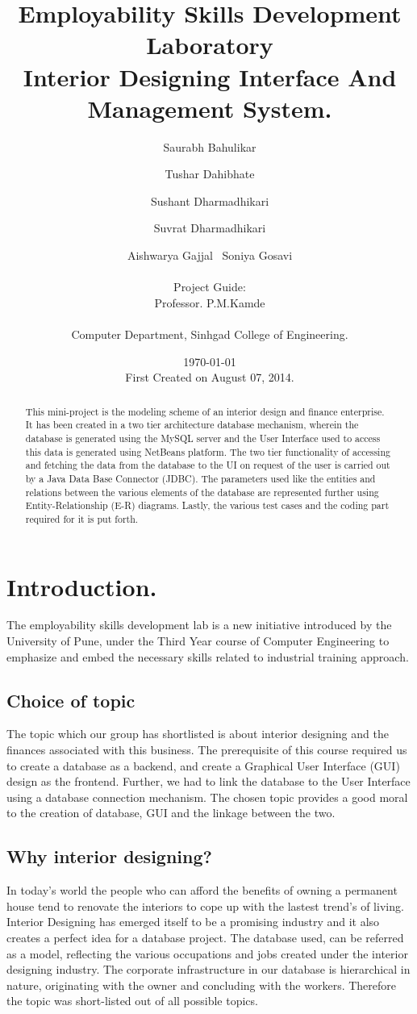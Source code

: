 \documentclass[12pt,a4paper]{report}
\title{Employability Skills Development Laboratory \\ \Large Interior Designing Interface And Management System.}
\author{ Saurabh Bahulikar\and Tushar Dahibhate \and Sushant Dharmadhikari \and Suvrat Dharmadhikari \and Aishwarya Gajjal \ Soniya Gosavi\\\\  Project Guide: \\ Professor. P.M.Kamde \\\\ Computer Department, Sinhgad College of Engineering.}
\date{\today \\ First Created on August 07, 2014.}
\begin{document}
\maketitle
\begin{abstract}
This mini-project is the modeling scheme of an interior design and finance enterprise. It has been created in a two tier architecture database mechanism, wherein the database is generated using the MySQL server and the User Interface used to access this data is generated using NetBeans platform. The two tier functionality of accessing and fetching the data from the database to the UI on request of the user is carried out by a Java Data Base Connector (JDBC). The parameters used like the entities and relations between the various elements of the database are represented further using Entity-Relationship (E-R) diagrams. Lastly, the various test cases and the coding part required for it is put forth.
\end{abstract}

\tableofcontents

\chapter{Introduction.}%
The employability skills development lab is a new initiative introduced by the University of Pune, under the Third Year course of Computer Engineering to emphasize and embed the necessary skills related to industrial training approach.

\section{Choice of topic}
The topic which our group has shortlisted is about interior designing and the finances associated with this business. The prerequisite of this course required us to create a database as a backend, and create a Graphical User Interface (GUI) design as the frontend. Further, we had to link the database to the User Interface using a database connection mechanism. The chosen topic provides a good moral to the creation of database, GUI and the linkage between the two.

\section{Why interior designing?}
In today's world the people who can afford the benefits of owning a permanent house tend to renovate the interiors to cope up with the lastest trend's of living. Interior Designing has emerged itself to be a promising industry and it also creates a perfect idea for a database project. The database used, can be referred as a model, reflecting the various occupations and jobs created under the interior designing industry. The corporate infrastructure in our database is hierarchical in nature, originating with the owner and concluding with the workers. Therefore the topic was short-listed out of all possible topics. 
\end{document}
